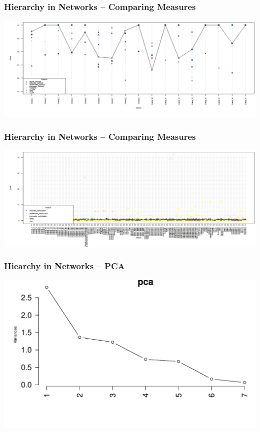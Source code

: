 \documentclass[xcolor={table}]{beamer}
\newenvironment{changemargin}[2]{%
  \begin{list}{}{%
    \setlength{\topsep}{0pt}%
    \setlength{\leftmargin}{#1}%
    \setlength{\rightmargin}{#2}%
    \setlength{\listparindent}{\parindent}%
    \setlength{\itemindent}{\parindent}%
    \setlength{\parsep}{\parskip}%
  }%
  \item[]}{\end{list}}
\begin{document}
\begin{frame}\frametitle{Hierarchy in Networks -- Comparing Measures}
\begin{changemargin}{-2cm}{ -2cm}
	\centering
\includegraphics[scale = 0.29]{images/multi1.jpeg}
\end{changemargin}
\end{frame}

\begin{frame}\frametitle{Hierarchy in Networks -- Comparing Measures}
	\begin{changemargin}{-2cm}{ -2cm}
		\centering
		\includegraphics[scale = 0.29]{images/multi2.jpeg}
	\end{changemargin}
\end{frame}

\begin{frame}\frametitle{Hiearchy in Networks -- PCA}
\begin{changemargin}{-2cm}{ -2cm}
		\centering
		\includegraphics[scale = 0.6]{images/Eigenvalues.pdf}
\end{changemargin}
\end{frame}
\end{document}
